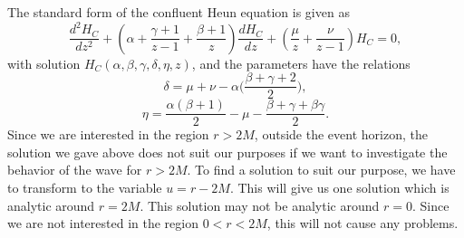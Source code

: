 \documentclass{article}
\begin{document}
The standard form of the confluent Heun equation is given as \cite{Fiz1,Fiz2}
%
\begin{equation}
    {\frac{{d^{2}H_C}}{{dz^{2}}}}+\left( \alpha +{\frac{{\gamma+1}}{{z-1}}}+{\frac{{\beta+1}}{{z}}}%
    \right) {\frac{{dH_C}}{{dz}}}+\left({\frac{{\mu}}{{z}}}+ {\frac{{\nu}}{{z-1}}}\right)H_C =0, \label{fizheun}
\end{equation}
%
with solution $H_C(\alpha, \beta, \gamma, \delta,\eta,z)$, and the parameters have the relations
%
\begin{equation}
    \delta = \mu+\nu-\alpha \bigg( \frac{{ \beta+\gamma+2}}{{2}} \bigg),
\end{equation}
%
\begin{equation}
    \eta = \frac{{ \alpha(\beta+1) }}{{2}} - \mu - \frac {{ \beta+\gamma+ \beta \gamma}}{{2}}.
\end{equation}
Since we are interested in the region $r>2M$, outside the event horizon, the solution we gave above does not
suit our purposes if we want to investigate the behavior of the wave for $r>2M$. To find a solution
to suit our purpose, we have to transform to the variable  $u= r-2M$. This will give us one solution which is analytic around $r=2M$.
This solution may not be analytic around $r=0$. Since we are not interested in the region $0<r<2M$, this will not cause any problems.
\end{document}
